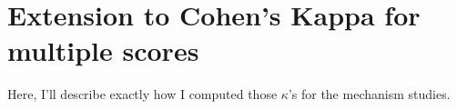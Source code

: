 \graphicspath{{appendices/kappa-extension/}}

\chapter{Extension to Cohen's Kappa for multiple scores}

Here, I'll describe exactly how I computed those $\kappa$'s for the mechanism
studies.
